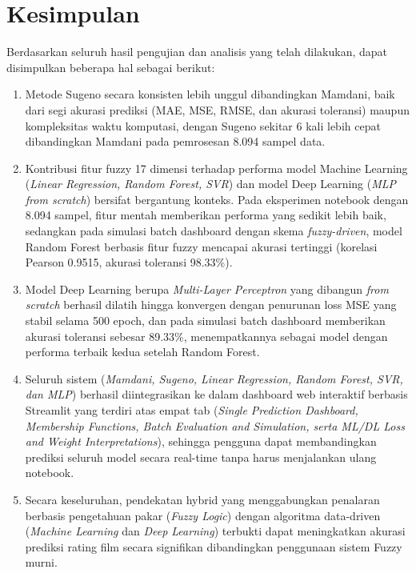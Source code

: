\documentclass[11pt,a4paper]{article}
\begin{document}
\section{Kesimpulan}
Berdasarkan seluruh hasil pengujian dan analisis yang telah dilakukan, dapat disimpulkan beberapa hal sebagai berikut:
\begin{enumerate}
    \item Metode Sugeno secara konsisten lebih unggul dibandingkan Mamdani, baik dari segi akurasi prediksi (MAE, MSE, RMSE, dan akurasi toleransi) maupun kompleksitas waktu komputasi, dengan Sugeno sekitar 6 kali lebih cepat dibandingkan Mamdani pada pemrosesan 8.094 sampel data.
    \item Kontribusi fitur fuzzy 17 dimensi terhadap performa model Machine Learning (\textit{Linear Regression, Random Forest, SVR}) dan model Deep Learning (\textit{MLP from scratch}) bersifat bergantung konteks. Pada eksperimen notebook dengan 8.094 sampel, fitur mentah memberikan performa yang sedikit lebih baik, sedangkan pada simulasi batch dashboard dengan skema \textit{fuzzy-driven}, model Random Forest berbasis fitur fuzzy mencapai akurasi tertinggi (korelasi Pearson 0.9515, akurasi toleransi 98.33\%).
    \item Model Deep Learning berupa \textit{Multi-Layer Perceptron} yang dibangun \textit{from scratch} berhasil dilatih hingga konvergen dengan penurunan loss MSE yang stabil selama 500 epoch, dan pada simulasi batch dashboard memberikan akurasi toleransi sebesar 89.33\%, menempatkannya sebagai model dengan performa terbaik kedua setelah Random Forest.
    \item Seluruh sistem (\textit{Mamdani, Sugeno, Linear Regression, Random Forest, SVR, dan MLP}) berhasil diintegrasikan ke dalam dashboard web interaktif berbasis Streamlit yang terdiri atas empat tab (\textit{Single Prediction Dashboard, Membership Functions, Batch Evaluation and Simulation, serta ML/DL Loss and Weight Interpretations}), sehingga pengguna dapat membandingkan prediksi seluruh model secara real-time tanpa harus menjalankan ulang notebook.
    \item Secara keseluruhan, pendekatan hybrid yang menggabungkan penalaran berbasis pengetahuan pakar (\textit{Fuzzy Logic}) dengan algoritma data-driven (\textit{Machine Learning} dan \textit{Deep Learning}) terbukti dapat meningkatkan akurasi prediksi rating film secara signifikan dibandingkan penggunaan sistem Fuzzy murni.
\end{enumerate}
\end{document}
